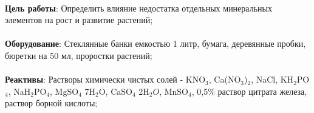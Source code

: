 








\begin{footnotesize}

\paragraph*{}\textbf{Цель работы}: Определить влияние недостатка отдельных минеральных элементов на рост и развитие растений;

\paragraph*{}\textbf{Оборудование}: Стеклянные банки емкостью 1 литр, бумага, деревянные пробки, бюретки на 50 мл, проростки растений;

\paragraph*{}\textbf{Реактивы}: Растворы химически чистых солей - KNO${_3}$, Ca(NO${_3}$)${_2}$, NaCl, KH${_2}$PO${_4}$, NaH${_2}$PO${_4}$, MgSO${_4}$ \textperiodcentered 7H${_2}$O, CaSO${_4}$ \textperiodcentered 2H${_2}O$, MnSO${_4}$, 0,5\% раствор цитрата железа, раствор борной кислоты;

\end{footnotesize}


